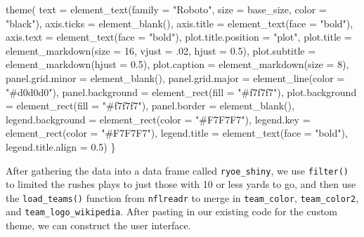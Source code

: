 \documentclass[
  letterpaper,
]{krantz}
\newenvironment{Shaded}{\begin{snugshade}}{\end{snugshade}}
\newcommand{\AttributeTok}[1]{\textcolor[rgb]{0.40,0.45,0.13}{#1}}
\newcommand{\DecValTok}[1]{\textcolor[rgb]{0.68,0.00,0.00}{#1}}
\newcommand{\FloatTok}[1]{\textcolor[rgb]{0.68,0.00,0.00}{#1}}
\newcommand{\FunctionTok}[1]{\textcolor[rgb]{0.28,0.35,0.67}{#1}}
\newcommand{\NormalTok}[1]{\textcolor[rgb]{0.00,0.23,0.31}{#1}}
\newcommand{\StringTok}[1]{\textcolor[rgb]{0.13,0.47,0.30}{#1}}
\begin{document}
\begin{Shaded}
\begin{Highlighting}[]
  \FunctionTok{theme}\NormalTok{(}
    \AttributeTok{text =} \FunctionTok{element\_text}\NormalTok{(}\AttributeTok{family =} \StringTok{"Roboto"}\NormalTok{,}
                        \AttributeTok{size =}\NormalTok{ base\_size,}
                        \AttributeTok{color =} \StringTok{"black"}\NormalTok{),}
    \AttributeTok{axis.ticks =} \FunctionTok{element\_blank}\NormalTok{(),}
    \AttributeTok{axis.title =} \FunctionTok{element\_text}\NormalTok{(}\AttributeTok{face =} \StringTok{"bold"}\NormalTok{),}
    \AttributeTok{axis.text =} \FunctionTok{element\_text}\NormalTok{(}\AttributeTok{face =} \StringTok{"bold"}\NormalTok{),}
    \AttributeTok{plot.title.position =} \StringTok{"plot"}\NormalTok{,}
    \AttributeTok{plot.title =} \FunctionTok{element\_markdown}\NormalTok{(}\AttributeTok{size =} \DecValTok{16}\NormalTok{,}
                                  \AttributeTok{vjust =}\NormalTok{ .}\DecValTok{02}\NormalTok{,}
                                  \AttributeTok{hjust =} \FloatTok{0.5}\NormalTok{),}
    \AttributeTok{plot.subtitle =} \FunctionTok{element\_markdown}\NormalTok{(}\AttributeTok{hjust =} \FloatTok{0.5}\NormalTok{),}
    \AttributeTok{plot.caption =} \FunctionTok{element\_markdown}\NormalTok{(}\AttributeTok{size =} \DecValTok{8}\NormalTok{),}
    \AttributeTok{panel.grid.minor =} \FunctionTok{element\_blank}\NormalTok{(),}
    \AttributeTok{panel.grid.major =}  \FunctionTok{element\_line}\NormalTok{(}\AttributeTok{color =} \StringTok{"\#d0d0d0"}\NormalTok{),}
    \AttributeTok{panel.background =} \FunctionTok{element\_rect}\NormalTok{(}\AttributeTok{fill =} \StringTok{"\#f7f7f7"}\NormalTok{),}
    \AttributeTok{plot.background =} \FunctionTok{element\_rect}\NormalTok{(}\AttributeTok{fill =} \StringTok{"\#f7f7f7"}\NormalTok{),}
    \AttributeTok{panel.border =} \FunctionTok{element\_blank}\NormalTok{(),}
    \AttributeTok{legend.background =} \FunctionTok{element\_rect}\NormalTok{(}\AttributeTok{color =} \StringTok{"\#F7F7F7"}\NormalTok{),}
    \AttributeTok{legend.key =} \FunctionTok{element\_rect}\NormalTok{(}\AttributeTok{color =} \StringTok{"\#F7F7F7"}\NormalTok{),}
    \AttributeTok{legend.title =} \FunctionTok{element\_text}\NormalTok{(}\AttributeTok{face =} \StringTok{"bold"}\NormalTok{),}
    \AttributeTok{legend.title.align =} \FloatTok{0.5}\NormalTok{)}
\NormalTok{\}}
\end{Highlighting}
\end{Shaded}

After gathering the data into a data frame called \texttt{ryoe\_shiny},
we use \texttt{filter()} to limited the rushes plays to just those with
10 or less yards to go, and then use the \texttt{load\_teams()} function
from \texttt{nflreadr} to merge in \texttt{team\_color},
\texttt{team\_color2}, and \texttt{team\_logo\_wikipedia}. After pasting
in our existing code for the custom theme, we can construct the user
interface.
\end{document}
